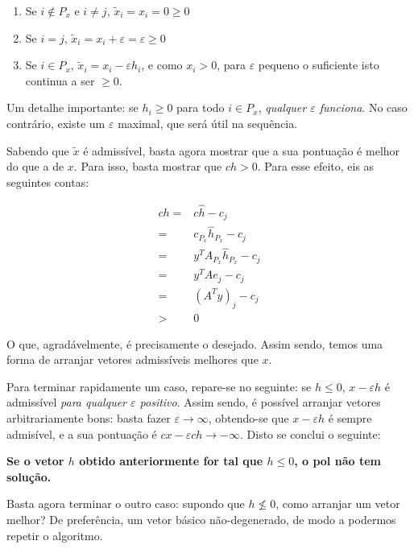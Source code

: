 \documentclass{article}
\theoremstyle{definition}
\begin{document}
	\begin{enumerate}
	\item Se $i \not \in P_x$ e $i \neq j$, $\tilde x_i = x_i = 0 \geq 0$
	
	\item Se $i = j$, $\tilde x_i = x_i + \varepsilon = \varepsilon \geq 0$
	
	\item Se $i \in P_x$, $\tilde x_i = x_i - \varepsilon h_i$, e como $x_i > 0$, para $\varepsilon$ pequeno o suficiente isto continua a ser $\geq 0$.
	\end{enumerate}
	
	Um detalhe importante: se $h_i \geq 0$ para todo $i \in P_x$, \emph{qualquer $\varepsilon$ funciona}. No caso contrário, existe um $\varepsilon$ maximal, que será útil na sequência.
	
	Sabendo que $\tilde x$ é admissível, basta agora mostrar que a sua pontuação é melhor do que a de $x$. Para isso, basta mostrar que $ch > 0$. Para esse efeito, eis as seguintes contas:
	
	\begin{align*}
	ch =& c \hat h - c_j \\
	   =& c_{P_x} \hat h_{P_x} - c_j\\
	   =& y^T A_{P_x} \hat h_{P_x} - c_j\\
	   =& y^T A e_j - c_j\\
	   =& (A^T y)_j - c_j\\
	   >& 0
	\end{align*}
	
	O que, agradávelmente, é precisamente o desejado. Assim sendo, temos uma forma de arranjar vetores admissíveis melhores que $x$.
	
	\medskip
	
	Para terminar rapidamente um caso, repare-se no seguinte: se $h \leq 0$, $x - \varepsilon h$ é admissível \emph{para qualquer $\varepsilon$ positivo}. Assim sendo, é possível arranjar vetores arbitrariamente bons: basta fazer $\varepsilon \rightarrow \infty$, obtendo-se que $x - \varepsilon h$ é sempre admisível, e a sua pontuação é $cx - \varepsilon ch \rightarrow - \infty$. Disto se conclui o seguinte:
	
	\textbf{Se o vetor $h$ obtido anteriormente for tal que $h \leq 0$, o pol não tem solução.}
	
	Basta agora terminar o outro caso: supondo que $h \not \leq 0$, como arranjar um vetor melhor? De preferência, um vetor básico não-degenerado, de modo a podermos repetir o algoritmo.
	
\end{document}
